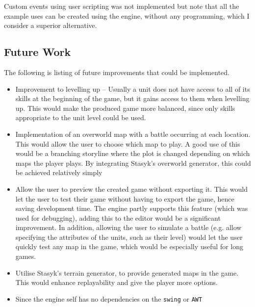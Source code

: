 Custom events using user scripting was not implemented but note that all the example uses can be created using the engine, without any programming, which I consider a superior alternative. 

\subsection{Future Work}

The following is listing of future improvements that could be implemented. 

\begin{itemize}
\item Improvement to levelling up -- Usually a unit does not have access to all of its skills at the beginning of the game, but it gains access to them when levelling up.  This would make the produced game  more balanced, since only skills appropriate to the unit level could be used.

\item Implementation of an overworld map with a battle occurring at each location. This would allow the user to choose which map to play.  A good use of this would be a branching storyline where the plot is changed depending on which maps the player plays. By integrating Stasyk's overworld generator, this could be achieved relatively simply
 
\item  Allow the user to preview the created game without exporting it.  This would let the user to test their game without having to export the game, hence saving development time.  The engine partly supports this feature (which was used for debugging), adding this to the editor would be a significant improvement. In addition, allowing the user to simulate a battle (e.g. allow specifying the attributes of the units, such as their level)  would let the user quickly test any map in the game, which would be especially useful for long games.

\item Utilise Stasyk's terrain generator, to provide generated maps in the game. This would enhance replayability and give the player more options. 

\item Since the engine self has no dependencies on the \texttt{swing} or \texttt{AWT}

\end{itemize}

